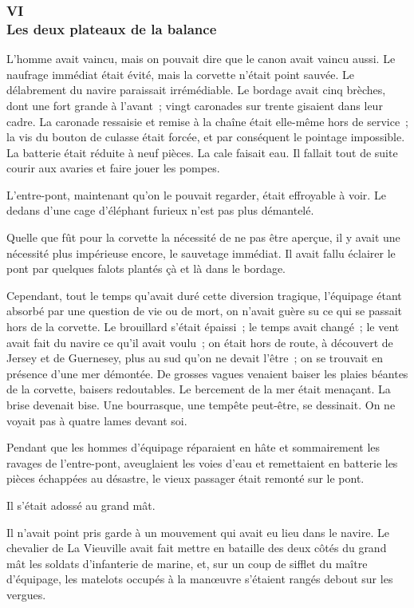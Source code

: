 \documentclass[french,twoside]{book} %
\begin{document}
 \subsubsection[{VI. Les deux plateaux de la balance}]{VI \\
Les deux plateaux de la balance}
\label{p1l2c6}
\noindent L’homme avait vaincu, mais on pouvait dire que le canon avait vaincu aussi. Le naufrage immédiat était évité, mais la corvette n’était point sauvée. Le délabrement du navire paraissait irrémédiable. Le bordage avait cinq brèches, dont une fort grande à l’avant ; vingt caronades sur trente gisaient dans leur cadre. La caronade ressaisie et remise à la chaîne était elle-même hors de service ; la vis du bouton de culasse était forcée, et par conséquent le pointage impossible. La batterie était réduite à neuf pièces. La cale faisait eau. Il fallait tout de suite courir aux avaries et faire jouer les pompes.\par
L’entre-pont, maintenant qu’on le pouvait regarder, était effroyable à voir. Le dedans d’une cage d’éléphant furieux n’est pas plus démantelé.\par
Quelle que fût pour la corvette la nécessité de ne pas être aperçue, il y avait une nécessité plus impérieuse encore, le sauvetage immédiat. Il avait fallu éclairer le pont par quelques falots plantés çà et là dans le bordage.\par
 Cependant, tout le temps qu’avait duré cette diversion tragique, l’équipage étant absorbé par une question de vie ou de mort, on n’avait guère su ce qui se passait hors de la corvette. Le brouillard s’était épaissi ; le temps avait changé ; le vent avait fait du navire ce qu’il avait voulu ; on était hors de route, à découvert de Jersey et de Guernesey, plus au sud qu’on ne devait l’être ; on se trouvait en présence d’une mer démontée. De grosses vagues venaient baiser les plaies béantes de la corvette, baisers redoutables. Le bercement de la mer était menaçant. La brise devenait bise. Une bourrasque, une tempête peut-être, se dessinait. On ne voyait pas à quatre lames devant soi.\par
Pendant que les hommes d’équipage réparaient en hâte et sommairement les ravages de l’entre-pont, aveuglaient les voies d’eau et remettaient en batterie les pièces échappées au désastre, le vieux passager était remonté sur le pont.\par
Il s’était adossé au grand mât.\par
Il n’avait point pris garde à un mouvement qui avait eu lieu dans le navire. Le chevalier de La Vieuville avait fait mettre en bataille des deux côtés du grand mât les soldats d’infanterie de marine, et, sur un coup de sifflet du maître d’équipage, les matelots occupés à la manœuvre s’étaient rangés debout sur les vergues.\par
\end{document}
